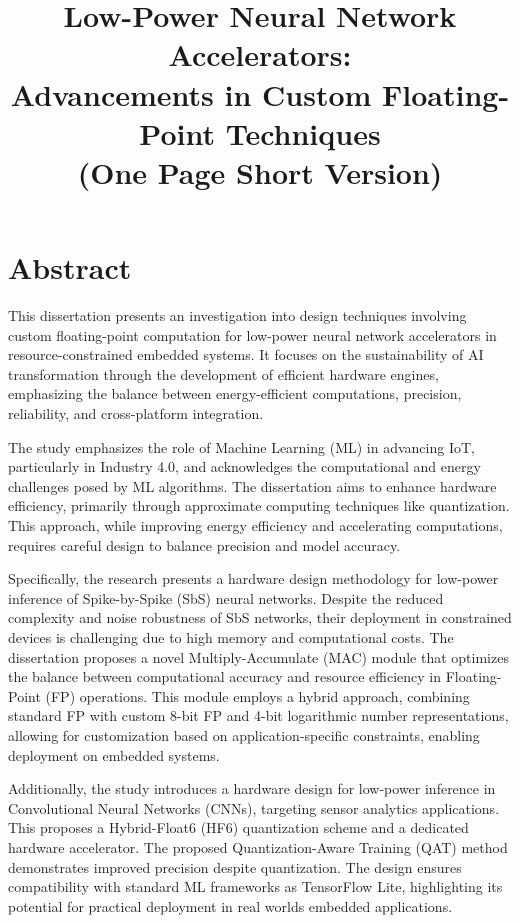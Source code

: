 \documentclass{article}
\title{Low-Power Neural Network Accelerators: \\Advancements in Custom Floating-Point Techniques\\{(One Page Short Version)}}
\author{}
\date{}
\begin{document}
	
	\maketitle
	
	\section*{Abstract}
	This dissertation presents an investigation into design techniques involving custom floating-point computation for low-power neural network accelerators in resource-constrained embedded systems. It focuses on the sustainability of AI transformation through the development of efficient hardware engines, emphasizing the balance between energy-efficient computations, precision, reliability, and cross-platform integration.
	
	The study emphasizes the role of Machine Learning (ML) in advancing IoT, particularly in Industry 4.0, and acknowledges the computational and energy challenges posed by ML algorithms. The dissertation aims to enhance hardware efficiency, primarily through approximate computing techniques like quantization. This approach, while improving energy efficiency and accelerating computations, requires careful design to balance precision and model accuracy.
	
	Specifically, the research presents a hardware design methodology for low-power inference of Spike-by-Spike (SbS) neural networks. Despite the reduced complexity and noise robustness of SbS networks, their deployment in constrained devices is challenging due to high memory and computational costs. The dissertation proposes a novel Multiply-Accumulate (MAC) module that optimizes the balance between computational accuracy and resource efficiency in Floating-Point (FP) operations. This module employs a hybrid approach, combining standard FP with custom 8-bit FP and 4-bit logarithmic number representations, allowing for customization based on application-specific constraints, enabling deployment on embedded systems.
	
	Additionally, the study introduces a hardware design for low-power inference in Convolutional Neural Networks (CNNs), targeting sensor analytics applications. This proposes a Hybrid-Float6 (HF6) quantization scheme and a dedicated hardware accelerator. The proposed Quantization-Aware Training (QAT) method demonstrates improved precision despite quantization. The design ensures compatibility with standard ML frameworks as TensorFlow Lite, highlighting its potential for practical deployment in real worlds embedded applications.
	
\end{document}
